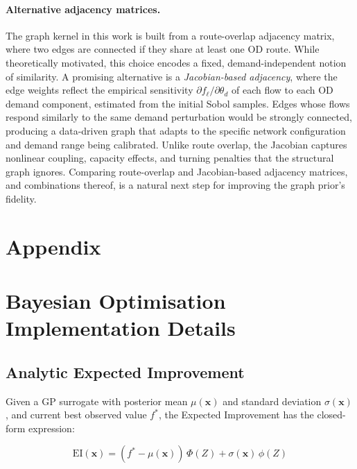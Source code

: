 \documentclass[11pt]{article}
\begin{document}
\paragraph{Alternative adjacency matrices.}
The graph kernel in this work is built from a route-overlap adjacency matrix, where two edges are connected if they share at least one OD route. While theoretically motivated, this choice encodes a fixed, demand-independent notion of similarity. A promising alternative is a \emph{Jacobian-based adjacency}, where the edge weights reflect the empirical sensitivity $\partial f_\ell / \partial \theta_d$ of each flow to each OD demand component, estimated from the initial Sobol samples. Edges whose flows respond similarly to the same demand perturbation would be strongly connected, producing a data-driven graph that adapts to the specific network configuration and demand range being calibrated. Unlike route overlap, the Jacobian captures nonlinear coupling, capacity effects, and turning penalties that the structural graph ignores. Comparing route-overlap and Jacobian-based adjacency matrices, and combinations thereof, is a natural next step for improving the graph prior's fidelity.


\newpage




\printbibliography[title={References}]

\newpage

\section*{Appendix}



\appendix




\section{Bayesian Optimisation Implementation Details}

\subsection{Analytic Expected Improvement}

Given a GP surrogate with posterior mean $\mu(\mathbf{x})$ and standard deviation 
$\sigma(\mathbf{x})$, and current best observed value $f^*$, the Expected Improvement 
has the closed-form expression:

\begin{equation}
    \text{EI}(\mathbf{x}) = (f^* - \mu(\mathbf{x}))\,\Phi(Z) + \sigma(\mathbf{x})\,\phi(Z)
\end{equation}
\end{document}
